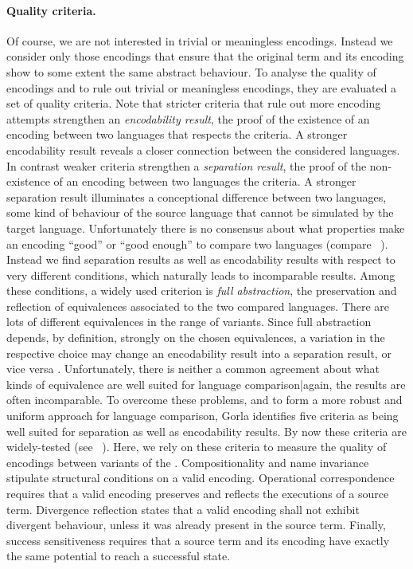 \documentclass[final,copyright,creativecommons]{eptcs}
\begin{document}
\paragraph{Quality criteria.} Of course, we are not interested in trivial or meaningless encodings. Instead we consider only those encodings that ensure that the original term and its encoding show to some extent the same abstract behaviour. To analyse the quality of encodings and to rule out trivial or meaningless encodings, they are evaluated \wrt a set of quality criteria.
Note that stricter criteria that rule out more encoding attempts strengthen an \emph{encodability result}, \ie the proof of the existence of an encoding between two languages that respects the criteria. A stronger encodability result reveals a closer connection between the considered languages.
In contrast weaker criteria strengthen a \emph{separation result}, \ie the proof of the non-existence of an encoding between two languages \wrt the criteria. A stronger separation result illuminates a conceptional difference between two languages, \ie some kind of behaviour of the source language that cannot be simulated by the target language.
Unfortunately there is no consensus about what properties make an encoding ``good'' or ``good enough'' to compare two languages (compare \eg~\cite{parrow08}). Instead we find separation results as well as encodability results with respect to very different conditions, which naturally leads to incomparable results.
Among these conditions, a widely used criterion is \emph{full abstraction}, \ie the preservation and reflection of equivalences associated to the two compared languages. There are lots of different equivalences in the range of \piCal variants. Since full abstraction depends, by definition, strongly on the chosen equivalences, a variation in the respective choice may change an encodability result into a separation result, or vice versa \cite{gorlaNestmann}. Unfortunately, there is neither a common agreement about what kinds of equivalence are well suited for language comparison{|}again, the results are often incomparable.
To overcome these problems, and to form a more robust and uniform approach for language comparison, Gorla \cite{gorla} identifies five criteria as being well suited for separation as well as encodability results. By now these criteria are widely-tested (see \eg~\cite{gorla10}). Here, we rely on these criteria to measure the quality of encodings between variants of the \piCal.
Compositionality and name invariance stipulate structural conditions on a valid encoding. Operational correspondence requires that a valid encoding preserves and reflects the executions of a source term. Divergence reflection states that a valid encoding shall not exhibit divergent behaviour, unless it was already present in the source term. Finally, success sensitiveness requires that a source term and its encoding have exactly the same potential to reach a successful state.
\end{document}
